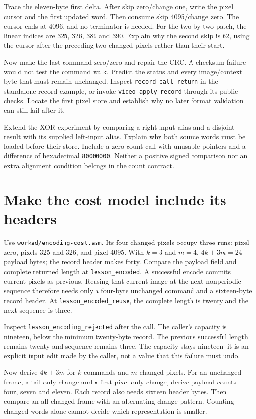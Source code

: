 Trace the eleven-byte first delta. After skip zero/change one, write the pixel
cursor and the first updated word. Then consume skip 4095/change zero. The
cursor ends at 4096, and no terminator is needed. For the two-by-two patch, the
linear indices are 325, 326, 389 and 390. Explain why the second skip is 62,
using the cursor after the preceding two changed pixels rather than their start.

Now make the last command zero/zero and repair the CRC. A checksum failure
would not test the command walk. Predict the status and every image/context
byte that must remain unchanged. Inspect \texttt{record\_call\_return} in the
standalone record example, or invoke \texttt{video\_apply\_record} through its
public checks. Locate the first pixel store and establish why no later format
validation can still fail after it.

Extend the XOR experiment by comparing a right-input alias and a disjoint
result with its supplied left-input alias. Explain why both source words must be loaded before their
store. Include a zero-count call with unusable pointers and a difference of
hexadecimal \texttt{80000000}. Neither a positive signed comparison nor an
extra alignment condition belongs in the count contract.

\section{Make the cost model include its headers}

Use \texttt{worked/encoding-cost.asm}. Its four changed pixels occupy three
runs: pixel zero, pixels 325 and 326, and pixel 4095. With $k=3$ and $m=4$,
$4k+3m=24$ payload bytes; the record header makes forty. Compare the payload
field and complete returned length at \texttt{lesson\_encoded}. A successful
encode commits current pixels as previous. Reusing that current image at the
next nonperiodic sequence therefore needs only a four-byte unchanged command
and a sixteen-byte record header. At \texttt{lesson\_encoded\_reuse}, the
complete length is twenty and the next sequence is three.

Inspect \texttt{lesson\_encoding\_rejected} after the call.
The caller's capacity is nineteen, below the minimum twenty-byte record.
The previous successful length remains twenty and sequence remains three. The capacity stays nineteen:
it is an explicit input edit made by the caller, not a value that this failure
must undo.

Now derive $4k+3m$ for $k$ commands and $m$ changed pixels. For an unchanged frame,
a tail-only change and a first-pixel-only change, derive payload counts four,
seven and eleven. Each record also needs sixteen header bytes. Then compare
an all-changed frame with an alternating change pattern. Counting changed words
alone cannot decide which representation is smaller.

